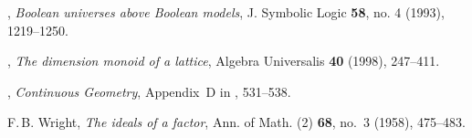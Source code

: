 \documentclass[psamsfonts,reqno]{memo-l}
\theoremstyle{plain}
\theoremstyle{definition}
\theoremstyle{remark}
\numberwithin{equation}{section}
\begin{document}
\begin{thebibliography}{99}
\bysame,
\emph{Boolean universes above Boolean models},
J. Symbolic Logic \textbf{58}, no. 4 (1993), 1219--1250.

\bysame,
\emph{The dimension monoid of a lattice},
Algebra Universalis \textbf{40} (1998), 247--411.

\bysame,
\emph{Continuous Geometry}, Appendix~D in \cite{GLT2}, 531--538.

F.\,B. Wright,
\emph{The ideals of a factor},
Ann. of Math. (2) \textbf{68}, no.~3 (1958), 475--483.

\end{thebibliography}

\printindex
\end{document}
